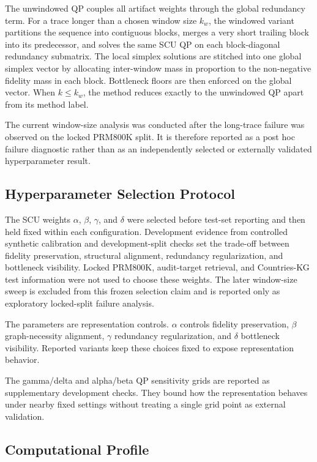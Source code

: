 \documentclass[pdflatex,sn-mathphys-num,iicol]{sn-jnl}
\begin{document}
The unwindowed QP couples all artifact weights through the global redundancy term. For a trace longer than a chosen window size $k_w$, the windowed variant partitions the sequence into contiguous blocks, merges a very short trailing block into its predecessor, and solves the same SCU QP on each block-diagonal redundancy submatrix. The local simplex solutions are stitched into one global simplex vector by allocating inter-window mass in proportion to the non-negative fidelity mass in each block. Bottleneck floors are then enforced on the global vector. When $k\leq k_w$, the method reduces exactly to the unwindowed QP apart from its method label.

The current window-size analysis was conducted after the long-trace failure was observed on the locked PRM800K split. It is therefore reported as a post hoc failure diagnostic rather than as an independently selected or externally validated hyperparameter result.

\subsection{Hyperparameter Selection Protocol}
\label{sec:hyperparameter-selection}

The SCU weights $\alpha$, $\beta$, $\gamma$, and $\delta$ were selected before test-set reporting and then held fixed within each configuration. Development evidence from controlled synthetic calibration and development-split checks set the trade-off between fidelity preservation, structural alignment, redundancy regularization, and bottleneck visibility. Locked PRM800K, audit-target retrieval, and Countries-KG test information were not used to choose these weights. The later window-size sweep is excluded from this frozen selection claim and is reported only as exploratory locked-split failure analysis.

The parameters are representation controls. $\alpha$ controls fidelity preservation, $\beta$ graph-necessity alignment, $\gamma$ redundancy regularization, and $\delta$ bottleneck visibility. Reported variants keep these choices fixed to expose representation behavior.

The gamma/delta and alpha/beta QP sensitivity grids are reported as supplementary development checks. They bound how the representation behaves under nearby fixed settings without treating a single grid point as external validation.

\subsection{Computational Profile}
\end{document}
